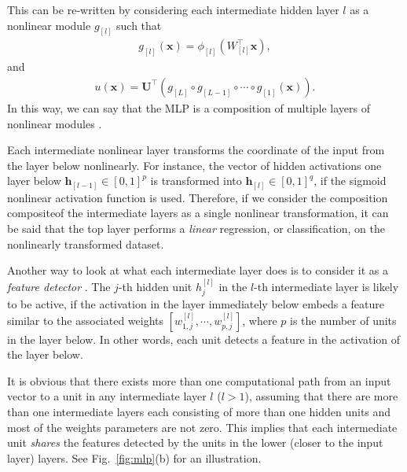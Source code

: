\documentclass[dissertation,nocontribution,draft*]{aaltoseries}
\newcommand{\qlay}[1]{\left[#1\right]}
\newcommand{\vect}[1]{\mathbf{#1}}
\newcommand{\matr}[1]{\mathbf{#1}}
\newcommand{\vh}[0]{\vect{h}}
\newcommand{\vx}[0]{\vect{x}}
\newcommand{\mU}[0]{\matr{U}}
\begin{document}
This can be re-written by considering each intermediate
hidden layer $l$ as a nonlinear module $g_{\qlay{l}}$ such that
\begin{align*}
    g_{\qlay{l}}(\vx) = \phi_{\qlay{l}}(W_{\qlay{l}}^\top \vx),
\end{align*}
and
\begin{align*}
    u(\vx) = \mU^\top 
    \left(g_{\qlay{L}} \circ g_{\qlay{L-1}} \circ \cdots
    \circ g_{\qlay{1}} (\vx) \right).
\end{align*}
In this way, we can say that the MLP is a composition of
multiple layers of nonlinear modules \citep{Bengio2007a}.

Each intermediate nonlinear layer transforms the coordinate
of the input from the layer below nonlinearly. For instance,
the vector of hidden activations one layer below
$\vh_{\qlay{l-1}} \in \left[ 0, 1\right]^p$ is transformed into
$\vh_{\qlay{l}} \in \left[0, 1\right]^q$, if the sigmoid nonlinear
activation function is used. Therefore, if we consider the
composition compositeof the intermediate layers as a single nonlinear
transformation, it can be said that the top layer performs a
\textit{linear} regression, or classification, on the
nonlinearly transformed dataset. 

Another way to look at what each intermediate layer does is
to consider it as a \textit{feature detector} \citep[see,
e.g.,][]{Haykin2009}. The $j$-th hidden unit $h_j^{\qlay{l}}$ in
the $l$-th intermediate layer is likely to be active, if the
activation in the layer immediately below embeds a feature
similar to the associated weights $\left[ w_{1,j}^{\qlay{l}},
\cdots, w_{p,j}^{\qlay{l}} \right]$, where $p$ is the number of
units in the layer below. In other words, each unit detects
a feature in the activation of the layer below.

It is obvious that there exists more than one computational
path from an input vector to a unit in any intermediate
layer $l$ ($l > 1$), assuming that there are more than one
intermediate layers each consisting of more than one hidden
units and most of the weights parameters are not zero. This
implies that each intermediate unit \textit{shares} the
features detected by the units in the lower (closer to the
input layer) layers.  See Fig.~\ref{fig:mlp}(b) for an
illustration.
\end{document}
